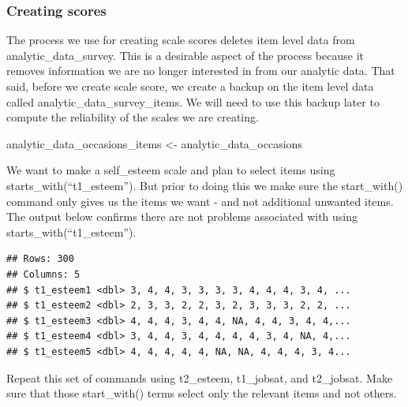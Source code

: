 \documentclass[
]{krantz}
\makeatletter
\newenvironment{Shaded}{\begin{snugshade}}{\end{snugshade}}
\newcommand{\KeywordTok}[1]{\textcolor[rgb]{0.27,0.27,0.27}{\textbf{#1}}}
\newcommand{\NormalTok}[1]{#1}
\newcommand{\OperatorTok}[1]{\textcolor[rgb]{0.43,0.43,0.43}{\textbf{#1}}}
\newcommand{\StringTok}[1]{\textcolor[rgb]{0.5,0.5,0.5}{#1}}
\newenvironment{kframe}{%
\medskip{}
\setlength{\fboxsep}{.8em}
 \def\at@end@of@kframe{}%
 \ifinner\ifhmode%
  \def\at@end@of@kframe{\end{minipage}}%
  \begin{minipage}{\columnwidth}%
 \fi\fi%
 \def\FrameCommand##1{\hskip\@totalleftmargin \hskip-\fboxsep
 \colorbox{shadecolor}{##1}\hskip-\fboxsep
     \hskip-\linewidth \hskip-\@totalleftmargin \hskip\columnwidth}%
 \MakeFramed {\advance\hsize-\width
   \@totalleftmargin\z@ \linewidth\hsize
   \@setminipage}}%
 {\par\unskip\endMakeFramed%
 \at@end@of@kframe}
\renewenvironment{Shaded}{\begin{kframe}}{\end{kframe}}
\makeatother
\begin{document}
\hypertarget{creating-scores-1}{%
\subsubsection{Creating scores}\label{creating-scores-1}}

The process we use for creating scale scores deletes item level data from analytic\_data\_survey. This is a desirable aspect of the process because it removes information we are no longer interested in from our analytic data. That said, before we create scale score, we create a backup on the item level data called analytic\_data\_survey\_items. We will need to use this backup later to compute the reliability of the scales we are creating.

\begin{Shaded}
\begin{Highlighting}[]
\NormalTok{analytic_data_occasions_items <-}\StringTok{ }\NormalTok{analytic_data_occasions}
\end{Highlighting}
\end{Shaded}

We want to make a self\_esteem scale and plan to select items using starts\_with(``t1\_esteem''). But prior to doing this we make sure the start\_with() command only gives us the items we want - and not additional unwanted items. The output below confirms there are not problems associated with using starts\_with(``t1\_esteem'').

\begin{Shaded}
\end{Shaded}

\begin{verbatim}
## Rows: 300
## Columns: 5
## $ t1_esteem1 <dbl> 3, 4, 4, 3, 3, 3, 3, 4, 4, 4, 3, 4, ...
## $ t1_esteem2 <dbl> 2, 3, 3, 2, 2, 3, 2, 3, 3, 3, 2, 2, ...
## $ t1_esteem3 <dbl> 4, 4, 4, 3, 4, 4, NA, 4, 4, 3, 4, 4,...
## $ t1_esteem4 <dbl> 3, 4, 4, 3, 4, 4, 4, 4, 3, 4, NA, 4,...
## $ t1_esteem5 <dbl> 4, 4, 4, 4, 4, NA, NA, 4, 4, 4, 3, 4...
\end{verbatim}

Repeat this set of commands using t2\_esteem, t1\_jobsat, and t2\_jobsat. Make sure that those start\_with() terms select only the relevant items and not others.
\end{document}

